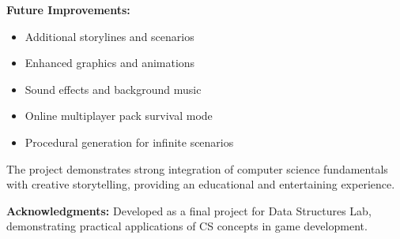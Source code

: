 \documentclass[12pt,a4paper]{article}
\begin{document}
\textbf{Future Improvements:}
\begin{itemize}
	\item Additional storylines and scenarios
	\item Enhanced graphics and animations
	\item Sound effects and background music
	\item Online multiplayer pack survival mode
	\item Procedural generation for infinite scenarios
\end{itemize}

The project demonstrates strong integration of computer science fundamentals with creative storytelling, providing an educational and entertaining experience.

\textbf{Acknowledgments:} Developed as a final project for Data Structures Lab, demonstrating practical applications of CS concepts in game development.
\end{document}
